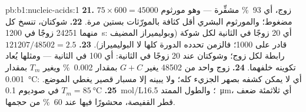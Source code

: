 \begin{solution}{pb:b1:nucleic-acids:1}
\textbf{21.} $75\times 600 = \num{45000}$ زوج، أي \qty{93}{\%} مشفِّرة
--- وهو مورثوم مضغوط؛ والمورثوم البشري أقل كثافة بالمورّثات بستين
مرة.
\textbf{22.} شوكتان، تنسخ كل منهما \num{24251} زوجًا في \qty{1200}{s}:
أي \qty{20}{} زوجًا في الثانية لكل شوكة (وبوليميراز المضيف قادر على
\qty{1000}{}؛ فالزمن تحدده الدورة كلها لا البوليميراز).
\textbf{23.} $\num{121207}/\num{48502} = 2.5$ رابطة لكل زوج؛ وشوكتان عند 20 زوجًا في الثانية: أي 100  في الثانية --- ومثلها يُعاد تكوينه خلفهما.
\textbf{24.} زوج واحد من \num{48502} يغير $G + C$ بمقدار
\qty{0.002}{\%} ويغير $T_m$ بمقدار \qty{0.001}{\celsius}: أي لا يمكن
كشفه بصهر الجزيء كله؛ ولا يبينه إلا مسبار قصير يغطي الموضع.
\textbf{25.} $T_m = \qty{85}{\celsius}$ في صوديوم \qty{0.1}{mol/L}؛
والطول الممتد \qty{16.5}{\micro m}، أي ثلاثمئة ضعف قطر القفيصة،
محشورًا فيها عند \qty{60}{\%} من حجمها.
\end{solution}
